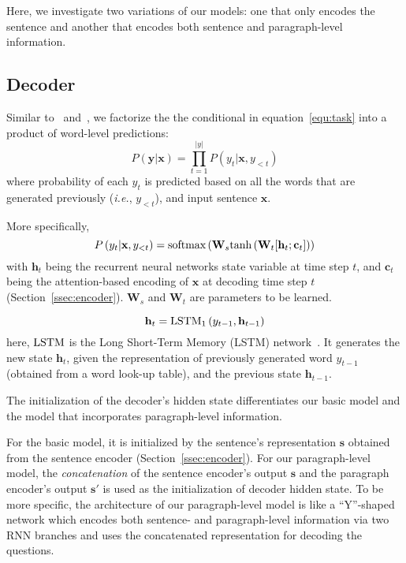 \documentclass[11pt,a4paper]{article}
\newcommand{\ie}{{\em i.e.}}
\begin{document}
Here, we investigate two variations of our models: one that only encodes the sentence and another that encodes both sentence and paragraph-level information. 

\subsection{Decoder}
\label{ssec:decoder}
Similar to~ and~, we factorize the the conditional in equation~\ref{equ:task} into a product of word-level predictions:
\begin{equation}
\nonumber
P \left( \mathbf{y} \vert \mathbf{x} \right) = \prod_{t=1}^{\vert y \vert} P \left( y_{t} \vert \mathbf{x}, y_{ <t}\right)
\end{equation}
where probability of each $y_t$ is predicted based on all the words that are generated previously (\ie, $y_{ <t}$), and input sentence $\mathbf{x}$.

More specifically, 
\begin{equation}
P \left( y_{t} \vert \mathbf{x}, y_{ <t}\right) = \textnormal{softmax} \left(\mathbf{W}_s \textnormal{tanh}\left( \mathbf{W}_t [ \mathbf{h}_t; \mathbf{c}_t]  \right )\right)
\end{equation}
with $\mathbf{h}_t$ being the recurrent neural networks state variable at time step $t$, and $\mathbf{c}_t$ being the attention-based encoding of $\mathbf{x}$ at decoding time step $t$ (Section~\ref{ssec:encoder}). $\mathbf{W}_s$ and $\mathbf{W}_t$ are parameters to be learned.

\begin{equation}
\mathbf{h}_t = \textnormal{LSTM}_1 \left( y_{t-1} , \mathbf{h}_{t-1}\right) 
\end{equation}
here, $\textnormal{LSTM}$ is the Long Short-Term Memory (LSTM) network~\cite{hochreiter1997long}. It generates the new state $\mathbf{h}_t$, given the representation of previously generated word $y_{t-1}$ (obtained from a word look-up table), and the previous state $\mathbf{h}_{t-1}$.

The initialization of the decoder's hidden state differentiates our basic model and the model that incorporates paragraph-level information.

For the basic model, it is initialized by the sentence's representation $\mathbf{s}$ obtained from the sentence encoder (Section~\ref{ssec:encoder}). For our paragraph-level model, the \emph{concatenation} of the sentence encoder's output $\mathbf{s}$ and the paragraph encoder's output $\mathbf{s}'$ is used as the initialization of decoder hidden state. To be more specific, the architecture of our paragraph-level model is like a ``Y''-shaped network which encodes both sentence- and paragraph-level information via two RNN branches and uses the concatenated representation for decoding the questions.
\end{document}
